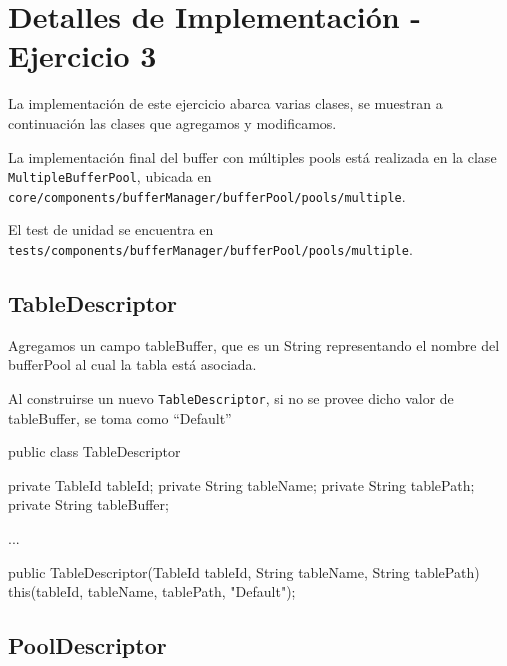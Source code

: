 \section{Detalles de Implementaci\'on - Ejercicio 3}

\noindent
La implementación de este ejercicio abarca varias clases, 
se muestran a continuación las clases que agregamos y modificamos.

\vspace*{0.2cm}

\noindent
La implementación final del buffer con múltiples pools está realizada 
en la clase \newline
\texttt{MultipleBufferPool}, ubicada en
\texttt{\small core/components/bufferManager/bufferPool/pools/multiple}.

\vspace*{0.2cm}

\noindent
El test de unidad se encuentra en 
\texttt{\small tests/components/bufferManager/bufferPool/pools/multiple}.


\subsection{TableDescriptor}

\noindent
Agregamos un campo tableBuffer, que es un String representando
el nombre del bufferPool al cual la tabla está asociada.

\vspace*{0.3cm}

\noindent
Al construirse un nuevo \texttt{TableDescriptor}, si no se
provee dicho valor de tableBuffer, se toma como ``Default''

\vspace*{-0.2cm}
\begin{verbatimtab}[4]
public class TableDescriptor
{
	private TableId tableId;
	private String tableName;
	private String tablePath;	
	private String tableBuffer;

	...

	public TableDescriptor(TableId tableId, String tableName, String tablePath)
	{
		this(tableId, tableName, tablePath, "Default");
	}
}
\end{verbatimtab}


\subsection{PoolDescriptor}

